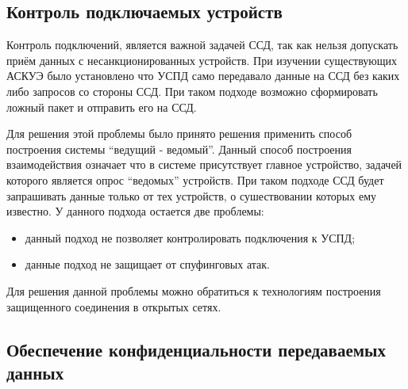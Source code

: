 \subsection{Контроль подключаемых устройств} %

Контроль подключений, является важной задачей ССД, так как нельзя допускать приём данных с несанкционированных устройств. При изучении существующих АСКУЭ было установлено что УСПД само передавало данные на ССД без каких либо запросов со стороны ССД. При таком подходе возможно сформировать ложный пакет и отправить его на ССД. 

Для решения этой проблемы было принято решения применить способ построения системы ``ведущий - ведомый''. Данный способ построения взаимодействия означает что в системе присутствует главное устройство, задачей которого является опрос ``ведомых'' устройств. При таком подходе ССД будет запрашивать данные только от тех устройств, о сушествовании которых ему известно. У данного подхода остается две проблемы:

\begin{itemize}
 \item данный подход не позволяет контролировать подключения к УСПД;
 \item данные подход не защищает от спуфинговых атак.
\end{itemize}

Для решения данной проблемы можно обратиться к технологиям построения защищенного соединения в открытых сетях. 

\subsection{Обеспечение конфиденциальности передаваемых данных} %

